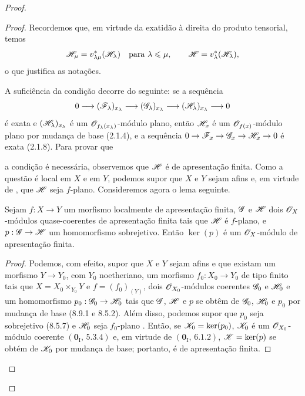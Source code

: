 \begin{proof}
\begin{proof}
Recordemos que, em virtude da exatidão à direita
do produto tensorial, temos
\[
\mathscr{H}_\mu=v_{\lambda\mu}^*(\mathscr{H}_\lambda)
\quad\text{para }\lambda\leqslant\mu,
\qquad
\mathscr{H}=v_\lambda^*(\mathscr{H}_\lambda),
\]
o que justifica as notações.

A suficiência da condição decorre do seguinte:
se a sequência
\[
0\longrightarrow(\mathscr{F}_\lambda)_{x_\lambda}
\longrightarrow(\mathscr{G}_\lambda)_{x_\lambda}
\longrightarrow(\mathscr{H}_\lambda)_{x_\lambda}
\longrightarrow0
\]
é exata e $(\mathscr{H}_\lambda)_{x_\lambda}$
é um $\mathscr{O}_{f_\lambda(x_\lambda)}$-módulo
plano, então $\mathscr{H}_x$ é um
$\mathscr{O}_{f(x)}$-módulo plano por mudança de
base (2.1.4), e a sequência
$0\to\sh{F}_x\to\sh{G}_x\to\sh{H}_x\to0$
é exata (2.1.8). Para provar que


a condição é necessária, observemos que
$\mathscr{H}$ é de apresentação finita. Como a questão
é local em $X$ e em $Y$, podemos supor que $X$
e $Y$ sejam afins e, em virtude de
, que $\mathscr{H}$ seja $f$-plano.
Consideremos agora o lema seguinte.

\begin{lemma}[11.3.9.1]
\label{IV.11.3.9.1}
Sejam $f:X\to Y$ um morfismo localmente de
apresentação finita, $\mathscr{G}$ e $\mathscr{H}$
dois $\mathscr{O}_X$-módulos quase-coerentes de
apresentação finita tais que $\mathscr{H}$ é
$f$-plano, e $p:\sh{G}\to\sh{H}$ um
homomorfismo sobrejetivo. Então $\ker(p)$
é um $\mathscr{O}_X$-módulo de apresentação finita.
\end{lemma}

\begin{proof}
Podemos, com efeito, supor que $X$ e $Y$ sejam
afins e que existam um morfismo $Y\to Y_0$,
com $Y_0$ noetheriano, um morfismo
$f_0:X_0\to Y_0$ de tipo finito tais que
$X=X_0\times_{Y_0}Y$ e $f=(f_0)_{(Y)}$,
dois $\mathscr{O}_{X_0}$-módulos coerentes
$\mathscr{G}_0$ e $\mathscr{H}_0$ e um homomorfismo
$p_0:\sh{G}_0\to\sh{H}_0$ tais que
$\mathscr{G}$, $\mathscr{H}$ e $p$ se obtêm de
$\mathscr{G}_0$, $\mathscr{H}_0$ e $p_0$ por mudança
de base (8.9.1 e 8.5.2). Além disso, podemos
supor que $p_0$ seja sobrejetivo (8.5.7)
e $\mathscr{H}_0$ seja $f_0$-plano
. Então, se
$\mathscr{K}_0=\ker(p_0)$, $\mathscr{K}_0$ é um
$\mathscr{O}_{X_0}$-módulo coerente
$(\mathbf 0_{\mathrm I},\,5.3.4)$ e, em
virtude de $(\mathbf 0_{\mathrm I},\,6.1.2)$,
$\mathscr{K}=\ker(p)$ se obtém de $\mathscr{K}_0$
por mudança de base; portanto, é de
apresentação finita.
\end{proof}


\end{proof}
\end{proof}
